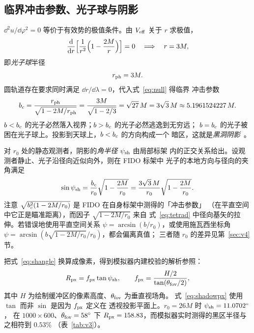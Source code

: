 \subsection{临界冲击参数、光子球与阴影}\label{sec:shadow}

$\dd^{2}u/\dd\varphi^{2}=0$ 等价于有效势的极值条件。由 $V_{\rm eff}$ 关于 $r$
求极值，
\begin{equation}
\frac{\mathrm{d}}{\mathrm{d} r}\Bigl[\frac{1}{r^{2}}\Bigl(1-\frac{2M}{r}\Bigr)\Bigr]=0
\quad\Longrightarrow\quad
r=3M,
\label{eq:photonsphere}
\end{equation}
即\emph{光子球}半径
\begin{equation}
r_{\mathrm{ph}}=3M .
\end{equation}
圆轨道存在要求同时满足 $\dd r/\dd\lambda=0$，代入式~\eqref{eq:null} 得临界
冲击参数
\begin{equation}
b_{c}=\frac{r_{\mathrm{ph}}}{\sqrt{1-2M/r_{\mathrm{ph}}}}
=\frac{3M}{\sqrt{1-2/3}}
=\sqrt{27}\,M=3\sqrt3\,M\approx5.1961524227\,M .
\label{eq:bc}
\end{equation}
$b<b_{c}$ 的光子必然落入视界；$b>b_{c}$ 的光子必然逃逸到无穷远；
$b=b_{c}$ 的光子被困在光子球上。投影到天球上，$b<b_{c}$ 的方向构成一个
暗区，这就是\emph{黑洞阴影}~\cite{bardeen1973,luminet1979,synge1966}。

对 $r_{0}$ 处的静态观测者，阴影的\emph{角半径} $\psi_{\rm sh}$ 由局部标架
内的正交关系给出。设观测者静止、光子沿径向近似向外，则在 FIDO 标架中
光子的本地方向与径向的夹角满足
\begin{equation}
\sin\psi_{\rm sh}=\frac{b_{c}}{r_{0}}\sqrt{1-\frac{2M}{r_{0}}}
=\frac{3\sqrt3\,M}{r_{0}}\sqrt{1-\frac{2M}{r_{0}}} .
\label{eq:shangle}
\end{equation}
注意 $\sqrt{b_{c}^{2}(1-2M/r_{0})}$ 是 FIDO 在自身标架中测得的「冲击参数」
（在平直空间中它正是瞄准距离），而因子 $\sqrt{1-2M/r_{0}}$ 来自
式~\eqref{eq:tetrad} 中径向基矢的拉伸。若错误地使用平直空间关系
$\psi=\arcsin(b/r_{0})$，或使用施瓦西坐标角
$\psi=\arcsin(b\sqrt{1-2M/r_{0}}/r_{0})$，都会偏离真值；
三者随 $r_{0}$ 的差异见第~\ref{sec:v4} 节。

把式~\eqref{eq:shangle} 换算成像素，得到模拟器内建校验的解析参照：
\begin{equation}
R_{\rm px}=f_{\rm px}\tan\psi_{\rm sh},
\qquad
f_{\rm px}=\frac{H/2}{\tan(\theta_{\rm fov}/2)},
\label{eq:shadowpx}
\end{equation}
其中 $H$ 为绘制缓冲区的像素高度、$\theta_{\rm fov}$ 为垂直视场角。
式~\eqref{eq:shadowpx} 使用 $\tan$ 而非 $\sin$ 是因为 $f_{\rm px}$ 定义在
透视投影平面上。$r_{0}=26M$ 时 $\psi_{\rm sh}=11.0702^{\circ}$，
在 $1000\times600$、$\theta_{\rm fov}=58^{\circ}$ 下
$R_{\rm px}=158.83$，而模拟器实时测得的黑区半径与之相符到 $0.53\%$
（表~\ref{tab:v3}）。

